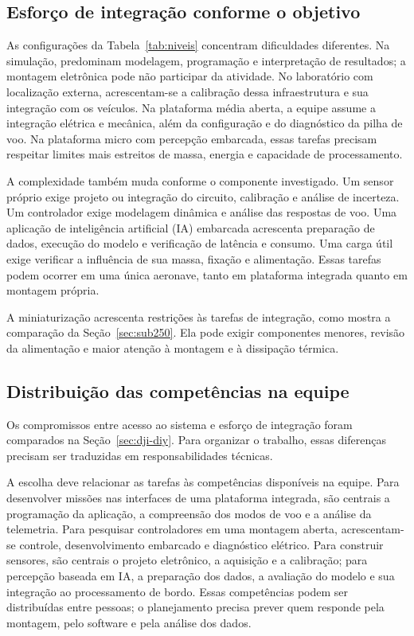 \documentclass[11pt,a4paper,oneside]{book}
\numberwithin{equation}{chapter}
\begin{document}
\subsection{Esforço de integração conforme o objetivo}
As configurações da Tabela~\ref{tab:niveis} concentram dificuldades diferentes. Na simulação, predominam modelagem, programação e interpretação de resultados; a montagem eletrônica pode não participar da atividade. No laboratório com localização externa, acrescentam-se a calibração dessa infraestrutura e sua integração com os veículos. Na plataforma média aberta, a equipe assume a integração elétrica e mecânica, além da configuração e do diagnóstico da pilha de voo. Na plataforma micro com percepção embarcada, essas tarefas precisam respeitar limites mais estreitos de massa, energia e capacidade de processamento.

A complexidade também muda conforme o componente investigado. Um sensor próprio exige projeto ou integração do circuito, calibração e análise de incerteza. Um controlador exige modelagem dinâmica e análise das respostas de voo. Uma aplicação de inteligência artificial (IA) embarcada acrescenta preparação de dados, execução do modelo e verificação de latência e consumo. Uma carga útil exige verificar a influência de sua massa, fixação e alimentação. Essas tarefas podem ocorrer em uma única aeronave, tanto em plataforma integrada quanto em montagem própria.

A miniaturização acrescenta restrições às tarefas de integração, como mostra a comparação da Seção~\ref{sec:sub250}. Ela pode exigir componentes menores, revisão da alimentação e maior atenção à montagem e à dissipação térmica.

\subsection{Distribuição das competências na equipe}
Os compromissos entre acesso ao sistema e esforço de integração foram comparados na Seção~\ref{sec:dji-diy}. Para organizar o trabalho, essas diferenças precisam ser traduzidas em responsabilidades técnicas.

A escolha deve relacionar as tarefas às competências disponíveis na equipe. Para desenvolver missões nas interfaces de uma plataforma integrada, são centrais a programação da aplicação, a compreensão dos modos de voo e a análise da telemetria. Para pesquisar controladores em uma montagem aberta, acrescentam-se controle, desenvolvimento embarcado e diagnóstico elétrico. Para construir sensores, são centrais o projeto eletrônico, a aquisição e a calibração; para percepção baseada em IA, a preparação dos dados, a avaliação do modelo e sua integração ao processamento de bordo. Essas competências podem ser distribuídas entre pessoas; o planejamento precisa prever quem responde pela montagem, pelo software e pela análise dos dados.
\end{document}
